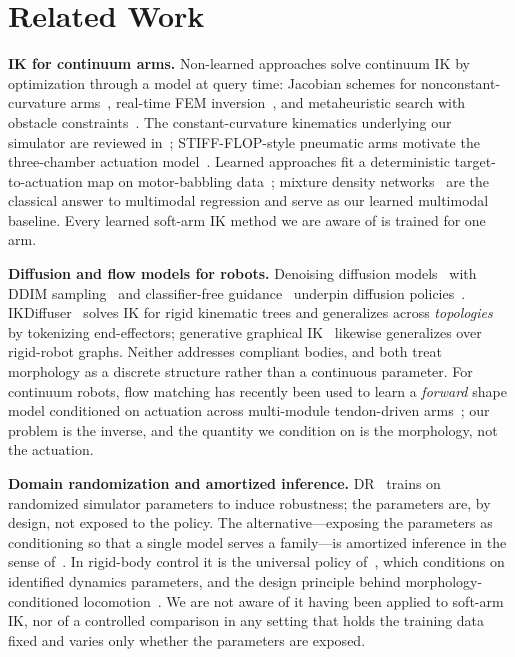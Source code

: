 \documentclass[robotics,article,submit,moreauthors]{Definitions/mdpi}
\begin{document}
\section{Related Work}

\textbf{IK for continuum arms.} Non-learned approaches solve continuum IK by
optimization through a model at query time: Jacobian schemes for
nonconstant-curvature arms~\cite{giorelli2015neural}, real-time FEM
inversion~\cite{duriez2013control}, and metaheuristic search with obstacle
constraints~\cite{obstacleaware2025}. The constant-curvature kinematics
underlying our simulator are reviewed in~\cite{webster2010design};
STIFF-FLOP-style pneumatic arms motivate the three-chamber actuation
model~\cite{cianchetti2014soft}. Learned approaches fit a deterministic
target-to-actuation map on motor-babbling data~\cite{giorelli2015neural};
mixture density networks~\cite{bishop1994mixture} are the classical answer
to multimodal regression and serve as our learned multimodal baseline.
Every learned soft-arm IK method we are aware of is trained for one arm.

\textbf{Diffusion and flow models for robots.} Denoising diffusion
models~\cite{ho2020denoising} with DDIM sampling~\cite{song2021denoising} and
classifier-free guidance~\cite{ho2022classifier} underpin diffusion
policies~\cite{chi2023diffusion}. IKDiffuser~\cite{zhang2025ikdiffuser}
solves IK for rigid kinematic trees and generalizes across
\emph{topologies} by tokenizing end-effectors; generative graphical
IK~\cite{limoyo2025generative} likewise generalizes over rigid-robot graphs.
Neither addresses compliant bodies, and both treat morphology as a discrete
structure rather than a continuous parameter. For continuum robots, flow
matching has recently been used to learn a \emph{forward} shape model
conditioned on actuation across multi-module tendon-driven
arms~\cite{flowmatching2026continuum}; our problem is the inverse, and the
quantity we condition on is the morphology, not the actuation.

\textbf{Domain randomization and amortized inference.} DR~\cite{tobin2017domain,
peng2018sim} trains on randomized simulator parameters to induce
robustness; the parameters are, by design, not exposed to the policy. The
alternative---exposing the parameters as conditioning so that a single
model serves a family---is amortized inference in the sense
of~\cite{gershman2014amortized}. In rigid-body control it is the universal
policy of~\cite{yu2017preparing}, which conditions on identified dynamics
parameters, and the design principle behind morphology-conditioned
locomotion~\cite{gupta2022metamorph}. We are not aware of it having been
applied to soft-arm IK, nor of a controlled comparison in any setting that
holds the training data fixed and varies only whether the parameters are
exposed.
\end{document}
